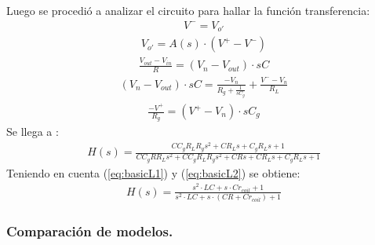 Luego se procedió a analizar el circuito para hallar la función transferencia:
\begin{align}V^- = V_{o'}\end{align}
\begin{align}V_{o'} = A(s)\cdot (V^+-V^-)\end{align}
\begin{align}\frac{V_{out}-V_{in}}{R}=(V_n-V_{out})\cdot sC\end{align}
\begin{align}(V_n-V_{out})\cdot sC = \frac{-V_n}{R_g+\frac{1}{sC_g}}+\frac{V^--V_n}{R_L}\end{align}
\begin{align}\frac{-V^+}{R_g}=(V^+-V_n)\cdot sC_g\end{align}
Se llega a :
\begin{align}  H(s)=\frac{C C_{g} R_{L} R_{g} s^{2} + C R_{L} s + C_{g} R_{L} s + 1}{C C_{g} R R_{L} s^{2} + C C_{g} R_{L} R_{g} s^{2} + C R s + C R_{L} s + C_{g} R_{L} s + 1} \end{align}
Teniendo en cuenta (\ref{eq:basicL1}) y (\ref{eq:basicL2}) se obtiene:
\begin{align}  H(s)=\frac{ s^{2}\cdot  LC + s \cdot  C r_{coil} + 1}{ s^{2}\cdot LC + s\cdot (C R+Cr_{coil}) + 1} 
\label{eq:BRG}
\end{align}
\subsubsection{Comparación de modelos.}

